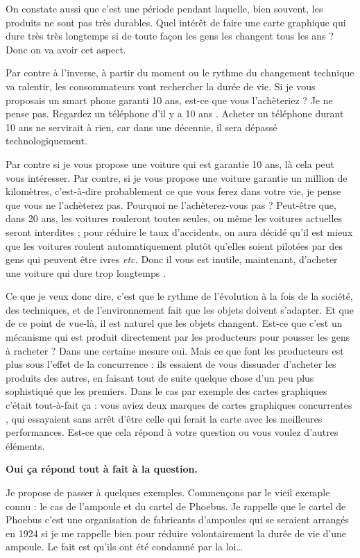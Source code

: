 \begin{small}
 On constate aussi que c'est une période pendant laquelle, bien souvent, les produits ne sont pas très durables. Quel intérêt de faire une carte graphique qui dure très très longtemps si de toute façon les gens les changent tous les ans ? Donc on va avoir cet aspect. 
 
 Par contre à l'inverse, à partir du moment ou le rythme du changement technique va  ralentir, les consommateurs vont rechercher la durée de vie. Si je vous proposais un smart phone garanti 10 ans, est-ce que vous l'achèteriez ? Je ne pense pas. Regardez un téléphone d'il y a 10 ans . Acheter un téléphone durant 10 ans ne servirait à rien, car dans une décennie,  il sera dépassé technologiquement. 
 
 Par contre si je vous propose une voiture qui est garantie 10 ans, là cela peut vous intéresser. Par contre, si je vous propose une voiture garantie un million de kilomètres, c'est-à-dire probablement ce que vous ferez dans votre vie, je pense que vous ne l'achèterez pas. Pourquoi ne l'achèterez-vous pas ? Peut-être que, dans 20 ans, les voitures rouleront toutes seules, ou même les voitures actuelles seront interdites ; pour réduire le taux d'accidents, on aura décidé qu'il est mieux que les voitures roulent automatiquement plutôt qu'elles soient pilotées par des gens qui peuvent être ivres \textit{etc.} Donc il vous est inutile, maintenant, d'acheter une voiture qui dure \og trop longtemps \fg{}. 
 
 Ce que je veux donc dire, c'est que le rythme de l'évolution à la fois de la société, des techniques, et de l'environnement fait que les objets doivent s'adapter. Et que de ce point de vue-là, il est naturel que les objets changent. Est-ce que c'est un mécanisme qui est produit directement par les producteurs pour pousser les gens à racheter ? Dans une certaine mesure oui. Mais  ce que font les producteurs est plus sous l'effet de la concurrence : ils essaient de vous dissuader d'acheter les produits des autres, en faisant tout de suite quelque chose d'un peu plus sophistiqué que les premiers. Dans le cas par exemple des cartes graphiques c'était tout-à-fait ça : vous aviez deux marques de cartes graphiques concurrentes , qui essayaient sans arrêt d'être celle qui ferait la carte avec les meilleures performances.  Est-ce que cela répond à votre question ou vous voulez d'autres éléments.

\smallbreak\textbf{Oui ça répond tout à fait à la question.}
\medbreak


Je propose de passer à quelques exemples. Commençons par le vieil exemple  connu : le cas de  l'ampoule et du cartel de Phoebus. Je rappelle que le cartel de Phoebus c'est une organisation de fabricants d'ampoules qui se seraient arrangés en 1924 si je me rappelle bien pour réduire volontairement la durée de vie d'une ampoule. Le fait est qu'ils ont été condamné par la loi\dots



\end{small}

